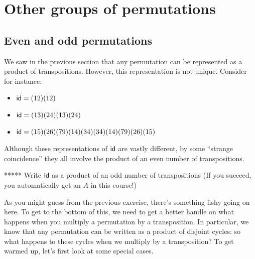 \section{Other groups of permutations }
\subsection{Even and odd permutations}

We saw in the previous section that any permutation can be represented as a product of transpositions. However, this representation is not unique. Consider for instance:
\begin{itemize}
\item
${\sf{i}d}  = (1 2) ( 1 2)$
\item
${\sf{i}d}  = (1 3 )(2 4 )(1 3 )( 2 4 )$
\item
${\sf{i}d}  = (1 5 )(2 6 )(7 9 )( 1 4 )(3 4)(3 4)(1 4)(7 9)(2 6)(1 5)$
\end{itemize}

\noindent
Although these representations of ${\sf{i}d} $ are vastly different, by some ``strange coincidence'' they all involve the product of an even number of 
transpositions.  

%
%
%
%
\begin{exercise}{}
***** Write ${\sf{i}d} $ as a product of an odd number of transpositions (If you succeed, you automatically get an $A$ in this course!)
\end{exercise}

As you might guess from the previous exercise, there's something fishy going on here. 
To get to the bottom of this, we need to  get a better handle on what happens when you multiply a permutation by a transposition. 
In particular, we know that any permutation can be written as a product of  disjoint cycles: so what happens to these cycles when we multiply by a transposition? To get warmed up, let's first look at some special cases.

